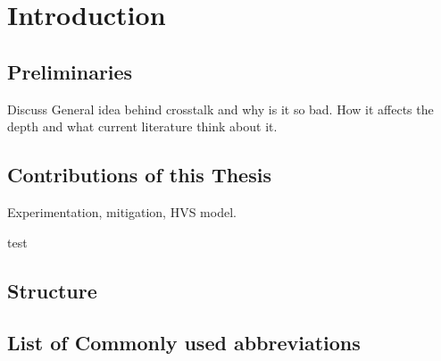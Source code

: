 \chapter{Introduction}
\label{chap:intro}


\section{Preliminaries}
Discuss General idea behind crosstalk and why is it so bad. How it affects the depth and what current literature think about it.



\section{Contributions of this Thesis}
Experimentation, mitigation, HVS model.

test

\section{Structure}



\section{List of Commonly used abbreviations}

